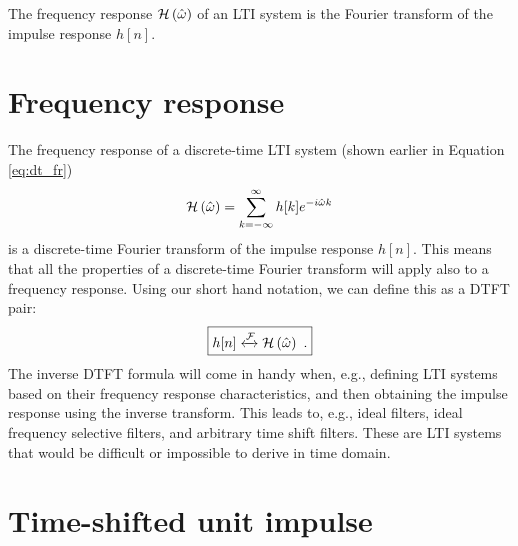 \fi




\usetikzlibrary{arrows.meta, positioning, quotes}
\begin{marginfigure}
 \begin{center}
\end{center}
\caption{The frequency response $\mathcal{H}\left(\hat{\omega}\right)$ of an LTI system is the Fourier transform of the impulse response $h[n]$.}
\end{marginfigure}

\section{Frequency response}

The frequency response of a discrete-time LTI system (shown earlier in Equation \ref{eq:dt_fr}) 
\begin{equation}
\mathcal{H}\left(\hat{\omega}\right) = \sum_{k=-\infty}^{\infty} h[k] e^{-i\hat{\omega} k}
\end{equation}
is a discrete-time Fourier transform of the impulse response
$h[n]$. This means that all the properties of a discrete-time Fourier
transform will apply also to a frequency response. Using our short
hand notation, we can define this as a DTFT pair:
\begin{equation}
\boxed{
h[n] \xleftrightarrow{\mathcal{F}} \mathcal{H}\left(\hat{\omega}\right)\,\,.
}
\end{equation}
The inverse DTFT formula will come in handy when, e.g., defining LTI
systems based on their frequency response characteristics, and then
obtaining the impulse response using the inverse transform. This leads
to, e.g., ideal filters, ideal frequency selective filters, and
arbitrary time shift filters. These are LTI systems that would be
difficult or impossible to derive in time domain.

\section{Time-shifted unit impulse}

